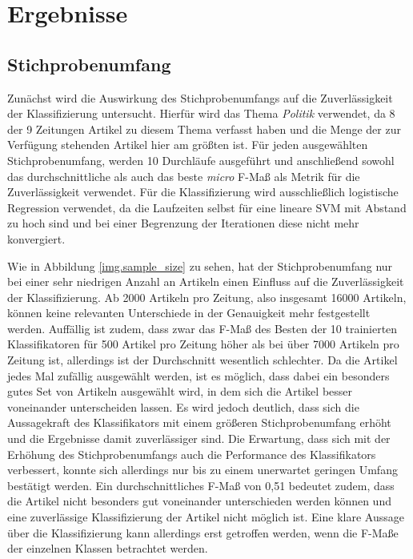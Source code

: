 \section{Ergebnisse}

\subsection{Stichprobenumfang}
Zunächst wird die Auswirkung des Stichprobenumfangs auf die Zuverlässigkeit der Klassifizierung untersucht. Hierfür wird das Thema \emph{Politik} verwendet, da 8 der 9 Zeitungen Artikel zu diesem Thema verfasst haben und die Menge der zur Verfügung stehenden Artikel hier am größten ist. Für jeden ausgewählten Stichprobenumfang, werden 10 Durchläufe ausgeführt und anschließend sowohl das durchschnittliche als auch das beste \textit{micro} F-Maß als Metrik für die Zuverlässigkeit verwendet. Für die Klassifizierung wird ausschließlich logistische Regression verwendet, da die Laufzeiten selbst für eine lineare SVM mit Abstand zu hoch sind und bei einer Begrenzung der Iterationen diese nicht mehr konvergiert.


Wie in Abbildung \ref{img.sample_size} zu sehen, hat der Stichprobenumfang nur bei einer sehr niedrigen Anzahl an Artikeln einen Einfluss auf die Zuverlässigkeit der Klassifizierung. Ab 2000 Artikeln pro Zeitung, also insgesamt 16000 Artikeln, können keine relevanten Unterschiede in der Genauigkeit mehr festgestellt werden. Auffällig ist zudem, dass zwar das F-Maß des Besten der 10 trainierten Klassifikatoren für 500 Artikel pro Zeitung höher als bei über 7000 Artikeln pro Zeitung ist, allerdings ist der Durchschnitt wesentlich schlechter. Da die Artikel jedes Mal zufällig ausgewählt werden, ist es möglich, dass dabei ein besonders gutes Set von Artikeln ausgewählt wird, in dem sich die Artikel besser voneinander unterscheiden lassen. Es wird jedoch deutlich, dass sich die Aussagekraft des Klassifikators mit einem größeren Stichprobenumfang erhöht und die Ergebnisse damit zuverlässiger sind. Die Erwartung, dass sich mit der Erhöhung des Stichprobenumfangs auch die Performance des Klassifikators verbessert, konnte sich allerdings nur bis zu einem unerwartet geringen Umfang bestätigt werden. Ein durchschnittliches F-Maß von 0,51 bedeutet zudem, dass die Artikel nicht besonders gut voneinander unterschieden werden können und eine zuverlässige Klassifizierung der Artikel nicht möglich ist. Eine klare Aussage über die Klassifizierung kann allerdings erst getroffen werden, wenn die F-Maße der einzelnen Klassen betrachtet werden.

